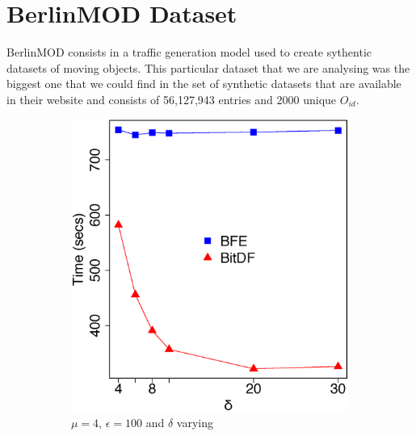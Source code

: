 {\section{BerlinMOD Dataset}
\label{sec:berlinmod}
BerlinMOD consists in a traffic generation model \citep{berlinmodpaper} used to create sythentic datasets of moving
objects. This particular dataset that we are analysing was the biggest one that we could find in the set of synthetic
datasets that are available in their website \citep{berlinmod} and consists of 56,127,943 entries and 2000 unique
$O_{id}$.

\begin{figure}[h!]
    \centering
    \begin{subfigure}[t]{0.48\textwidth}
        \includegraphics[width=\textwidth]{images/BerlinMOD_n_4_g_100_varying_l.eps}
        \caption{$\mu = 4$, $\epsilon = 100$ and $\delta$ varying}
        \label{fig:berlinmod_vary_l}
    \end{subfigure}
    \begin{subfigure}[t]{0.48\textwidth}

\end{subfigure}
\end{figure}}
